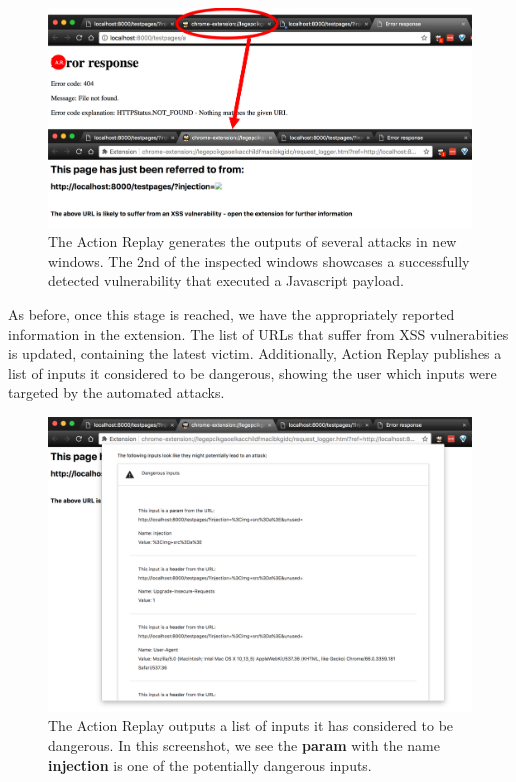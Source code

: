 \begin{figure}[h]
	\centering
	\includegraphics[width=\textwidth]{images/successful_replay.png}
	\caption{The Action Replay generates the outputs of several attacks in new windows. The 2nd of the inspected windows showcases a successfully detected vulnerability that executed a Javascript payload.}
	\label{fig:successful_replay}
\end{figure}

As before, once this stage is reached, we have the appropriately reported information in the extension. The list of URLs that suffer from XSS vulnerabities is updated, containing the latest victim. Additionally, Action Replay publishes a list of inputs it considered to be dangerous, showing the user which inputs were targeted by the automated attacks.  \\

\begin{figure}[h]
	\centering
	\includegraphics[width=\textwidth]{images/dangerous_inputs.png}
	\caption{The Action Replay outputs a list of inputs it has considered to be dangerous. In this screenshot, we see the \textbf{param} with the name \textbf{injection} is one of the potentially dangerous inputs. }
	\label{fig:dangerous_inputs}
\end{figure}





